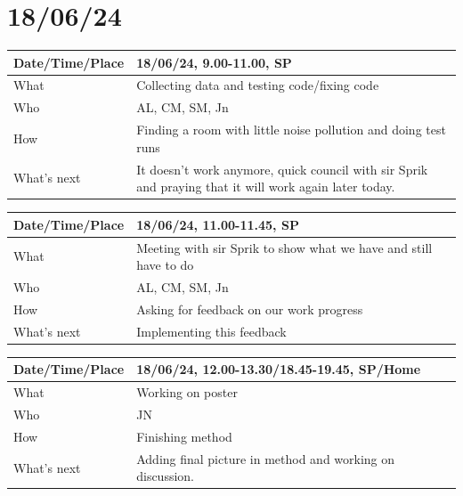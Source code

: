 \documentclass{article}
\begin{document}
\section{18/06/24}

\begin{table}[H]
\begin{tabular}{|p{1.5in}|p{4in}|}
\hline
Date/Time/Place & 18/06/24, 9.00-11.00, SP \\ \hline
What            & Collecting data and testing code/fixing code \\ \hline
Who             & AL, CM, SM, Jn \\ \hline
How             & Finding a room with little noise pollution and doing test runs\\ \hline
What's next     & It doesn't work anymore, quick council with sir Sprik and praying that it will work again later today.\\ \hline
\end{tabular}
\end{table}

\begin{table}[H]
\begin{tabular}{|p{1.5in}|p{4in}|}
\hline
Date/Time/Place & 18/06/24, 11.00-11.45, SP \\ \hline
What            & Meeting with sir Sprik to show what we have and still have to do \\ \hline
Who             & AL, CM, SM, Jn\\ \hline
How             & Asking for feedback on our work progress\\ \hline
What's next     & Implementing this feedback\\ \hline
\end{tabular}
\end{table}

\begin{table}[H]
\begin{tabular}{|p{1.5in}|p{4in}|}
\hline
Date/Time/Place & 18/06/24, 12.00-13.30/18.45-19.45, SP/Home \\ \hline
What            & Working on poster  \\ \hline
Who             & JN \\ \hline
How             & Finishing method \\ \hline
What's next     & Adding final picture in method and working on discussion. \\ \hline
\end{tabular}
\end{table}
\end{document}
